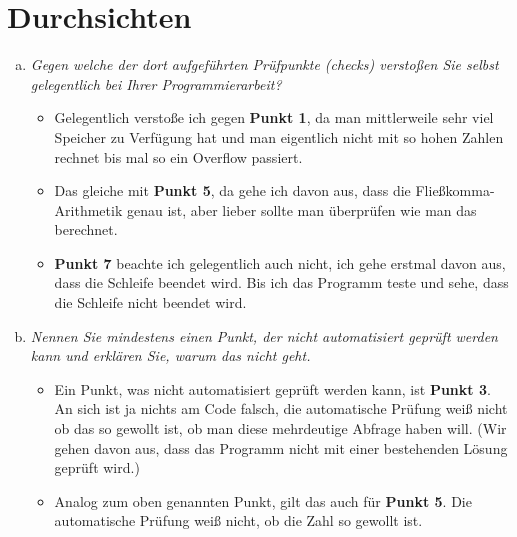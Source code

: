 

\newcommand{\dozent}{Lutz Prechelt}
\newcommand{\tutor}{Samuel Domiks}
\newcommand{\tutoriumNo}{02\\Materialien: Latex, Skript}
\newcommand{\ubungNo}{11}
\newcommand{\veranstaltung}{Softwaretechnik}
\newcommand{\semester}{SoSe21}
\newcommand{\studenten}{Jonny Lam \& Thore Brehmer}




\section{Durchsichten}
\begin{enumerate}[a)]
    \item {\itshape Gegen welche der dort aufgeführten Prüfpunkte (checks) verstoßen Sie selbst gelegentlich bei Ihrer Programmierarbeit?}
    \begin{itemize}
        \item Gelegentlich verstoße ich gegen \textbf{Punkt 1}, da man mittlerweile sehr viel Speicher zu Verfügung hat und man eigentlich nicht mit so hohen Zahlen rechnet bis mal so ein Overflow passiert.
        \item Das gleiche mit \textbf{Punkt 5}, da gehe ich davon aus, dass die Fließkomma-Arithmetik genau ist, aber lieber sollte man überprüfen wie man das berechnet.
        \item \textbf{Punkt 7} beachte ich gelegentlich auch nicht, ich gehe erstmal davon aus, dass die Schleife beendet wird. Bis ich das Programm teste und sehe, dass die Schleife nicht beendet wird.
    \end{itemize}
    \item {\itshape Nennen Sie mindestens einen Punkt, der nicht automatisiert geprüft werden kann und
erklären Sie, warum das nicht geht.}
    \begin{itemize}
        \item Ein Punkt, was nicht automatisiert geprüft werden kann, ist \textbf{Punkt 3}. An sich ist ja nichts am Code falsch, die automatische Prüfung weiß nicht ob das so gewollt ist, ob man diese mehrdeutige Abfrage haben will. (Wir gehen davon aus, dass das Programm nicht mit einer bestehenden Lösung geprüft wird.)
        \item Analog zum oben genannten Punkt, gilt das auch für \textbf{Punkt 5}. Die automatische Prüfung weiß nicht, ob die Zahl so gewollt ist. 

\end{itemize}
\end{enumerate}
